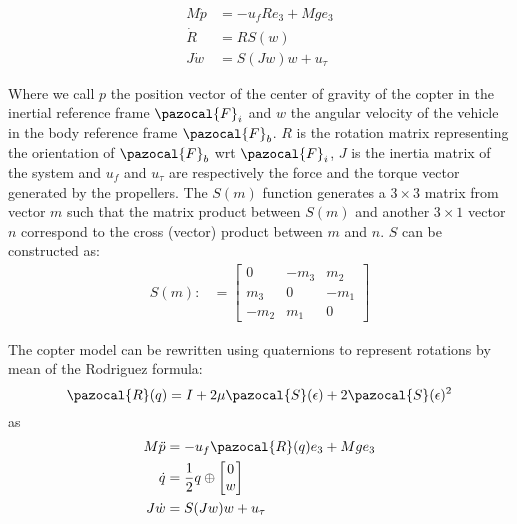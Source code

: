 \begin{equation} \label{eq:coptermodelmat}
\begin{split}
	M \ddot{p} &= -u_{f}Re_{3} + Mge_{3}\\
	\dot{R} &= RS(w)\\
	J\dot{w} &= S (Jw) w + u_{\tau}
\end{split}
\end{equation}

Where we call $ p $ the position vector of the center of gravity of the copter in the inertial reference frame $ \pazocal{F}_{i} $ and $ w $ the angular velocity of the vehicle in the body reference frame $ \pazocal{F}_{b} $. $ R $ is the rotation matrix representing the orientation of $ \pazocal{F}_{b} $ wrt $ \pazocal{F}_{i} $, $ J $ is the inertia matrix of the system and $ u_{f} $ and $ u_{\tau} $ are respectively the force and  the torque vector generated by the propellers.
The $S(m)$ function generates a $3\times3$ matrix from vector $m$ such that the matrix product between $S(m)$ and another $3\times1$ vector $n$ correspond to the cross (vector) product between $m$ and $n$. $S$ can be constructed as:
\begin{equation} \label{eq:coptermodelmat}
\begin{split}
S(m) :&= \begin{bmatrix}
0 & -m_{3} & m_{2}\\
m_{3} & 0 & -m_{1}\\
-m_{2} & m_{1} & 0
\end{bmatrix}
\end{split}
\end{equation}

The copter model can be rewritten using quaternions to represent rotations by mean of the Rodriguez formula\cite{bib:rodriguez}:
\[ \pazocal{R}(q) = I + 2 \mu \pazocal{S}(\epsilon) + 2 \pazocal{S}(\epsilon)^{2}
 \]
as
\begin{equation} \label{eq:coptermodelquat}
\begin{split}
M \ddot{p} &= -u_{f}\pazocal{R}(q)e_{3} + Mge_{3}\\
\dot{q} &= \frac{1}{2} q \oplus \begin{bmatrix} 0 \\ w \end{bmatrix} \\
J\dot{w} &= S (Jw) w + u_{\tau}
\end{split}
\end{equation}



